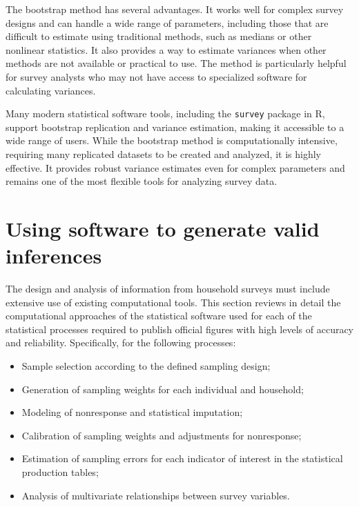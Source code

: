 \documentclass[
  12pt,
]{book}
\providecommand{\tightlist}{%
  \setlength{\itemsep}{0pt}\setlength{\parskip}{0pt}}
\begin{document}
The bootstrap method has several advantages. It works well for complex survey designs and can handle a wide range of parameters, including those that are difficult to estimate using traditional methods, such as medians or other nonlinear statistics. It also provides a way to estimate variances when other methods are not available or practical to use. The method is particularly helpful for survey analysts who may not have access to specialized software for calculating variances.

Many modern statistical software tools, including the \texttt{survey} package in R, support bootstrap replication and variance estimation, making it accessible to a wide range of users. While the bootstrap method is computationally intensive, requiring many replicated datasets to be created and analyzed, it is highly effective. It provides robust variance estimates even for complex parameters and remains one of the most flexible tools for analyzing survey data.

\hypertarget{using-software-to-generate-valid-inferences}{%
\section{Using software to generate valid inferences}\label{using-software-to-generate-valid-inferences}}

The design and analysis of information from household surveys must include extensive use of existing computational tools. This section reviews in detail the computational approaches of the statistical software used for each of the statistical processes required to publish official figures with high levels of accuracy and reliability. Specifically, for the following processes:

\begin{itemize}
\tightlist
\item
  Sample selection according to the defined sampling design;
\item
  Generation of sampling weights for each individual and household;
\item
  Modeling of nonresponse and statistical imputation;
\item
  Calibration of sampling weights and adjustments for nonresponse;
\item
  Estimation of sampling errors for each indicator of interest in the statistical production tables;
\item
  Analysis of multivariate relationships between survey variables.
\end{itemize}
\end{document}
